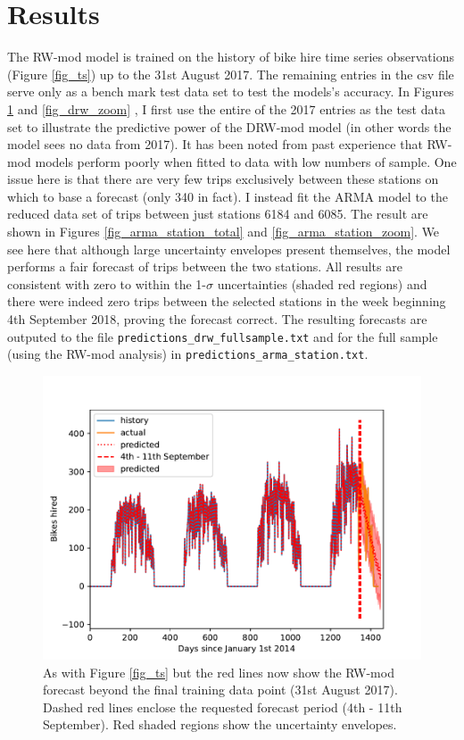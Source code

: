 \documentclass[10pt]{article}
\begin{document}
\section{Results}
\label{sec_results}
The RW-mod model is trained on the history of bike hire time series observations (Figure \ref{fig_ts}) up to the 31st August 2017. The remaining entries in the csv file serve only as a bench mark test data set to test the models's accuracy. In Figures \ref{fig_drw_total} and \ref{fig_drw_zoom} , I first use the entire of the 2017 entries as the test data set to illustrate the predictive power of the DRW-mod model (in other words the model sees no data from 2017). It has been noted from past experience that RW-mod models perform poorly when fitted to data with low numbers of sample. One issue here is that there are very few trips exclusively between these stations on which to base a forecast (only 340 in fact). I instead fit the ARMA model to the reduced data set of trips between just stations 6184 and 6085. The result are shown in Figures \ref{fig_arma_station_total} and \ref{fig_arma_station_zoom}. We see here that although large uncertainty envelopes present themselves, the model performs a fair forecast of trips between the two stations. All results are consistent with zero to within the 1-$\sigma$ uncertainties (shaded red regions) and there were indeed zero trips between the selected stations in the week beginning 4th September 2018, proving the forecast correct. The resulting forecasts are outputed to the file \verb|predictions_drw_fullsample.txt| and for the full sample (using the RW-mod analysis) in \verb|predictions_arma_station.txt|. 




\begin{figure}
\includegraphics[scale=1.0,angle=0,trim=0cm 0cm 0cm 0cm]{drw_total_ts.pdf}
\caption{As with Figure \ref{fig_ts} but the red lines now show the RW-mod forecast beyond the final training data point (31st August 2017). Dashed red lines enclose the requested forecast period (4th - 11th September). Red shaded regions show the uncertainty envelopes.}
\label{fig_drw_total}
\end{figure}
\end{document}

